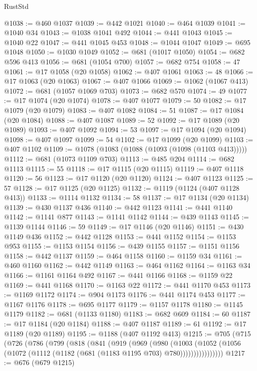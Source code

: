 \begin{lexlean}{RustStd}
\begin{coremodule}
{\begin{coremodule}
{{{{{{{{{{{{{{{{{{{{{{{{{@1038 := @460 @1037
@1039 := @442 @1021
@1040 := @464 @1039
@1041 := @1040 @34
@1043 := @1038 @1041 @492
@1044 := @441 @1043
@1045 := @1040 @22
@1047 := @441 @1045 @453
@1048 := @1044 @1047
@1049 := @695 @1048
@1050 := @1030 @1049
@1052 := @681 (@1017 @1050)
@1054 := @682 @596 @413
@1056 := @681 (@1054 @700)
@1057 := @682 @754
@1058 := 47
@1061 := @17 @1058 (@20 @1058)
@1062 := @407 @1061
@1063 := 48
@1066 := @17 @1063 (@20 @1063)
@1067 := @407 @1066
@1069 := @1062 (@1067 @413)
@1072 := @681 (@1057 @1069 @703)
@1073 := @682 @570
@1074 := 49
@1077 := @17 @1074 (@20 @1074)
@1078 := @407 @1077
@1079 := 50
@1082 := @17 @1079 (@20 @1079)
@1083 := @407 @1082
@1084 := 51
@1087 := @17 @1084 (@20 @1084)
@1088 := @407 @1087
@1089 := 52
@1092 := @17 @1089 (@20 @1089)
@1093 := @407 @1092
@1094 := 53
@1097 := @17 @1094 (@20 @1094)
@1098 := @407 @1097
@1099 := 54
@1102 := @17 @1099 (@20 @1099)
@1103 := @407 @1102
@1109 := @1078 (@1083 (@1088 (@1093 (@1098 (@1103 @413)))))
@1112 := @681 (@1073 @1109 @703)
@1113 := @485 @204
@1114 := @682 @1113
@1115 := 55
@1118 := @17 @1115 (@20 @1115)
@1119 := @407 @1118
@1120 := 56
@1123 := @17 @1120 (@20 @1120)
@1124 := @407 @1123
@1125 := 57
@1128 := @17 @1125 (@20 @1125)
@1132 := @1119 (@1124 (@407 @1128 @413))
@1133 := @1114 @1132
@1134 := 58
@1137 := @17 @1134 (@20 @1134)
@1139 := @430 @1137 @436
@1140 := @442 @1123
@1141 := @441 @1140
@1142 := @1141 @877
@1143 := @1141 @1142
@1144 := @439 @1143
@1145 := @1139 @1144
@1146 := 59
@1149 := @17 @1146 (@20 @1146)
@1151 := @430 @1149 @436
@1152 := @442 @1128
@1153 := @441 @1152
@1154 := @1153 @953
@1155 := @1153 @1154
@1156 := @439 @1155
@1157 := @1151 @1156
@1158 := @442 @1137
@1159 := @464 @1158
@1160 := @1159 @34
@1161 := @460 @1160
@1162 := @442 @1149
@1163 := @464 @1162
@1164 := @1163 @34
@1166 := @1161 @1164 @492
@1167 := @441 @1166
@1168 := @1159 @22
@1169 := @441 @1168
@1170 := @1163 @22
@1172 := @441 @1170 @453
@1173 := @1169 @1172
@1174 := @904 @1173
@1176 := @441 @1174 @453
@1177 := @1167 @1176
@1178 := @695 @1177
@1179 := @1157 @1178
@1180 := @1145 @1179
@1182 := @681 (@1133 @1180)
@1183 := @682 @609
@1184 := 60
@1187 := @17 @1184 (@20 @1184)
@1188 := @407 @1187
@1189 := 61
@1192 := @17 @1189 (@20 @1189)
@1195 := @1188 (@407 @1192 @413)
@1215 := @705
    (@715
      (@726
        (@786
          (@799
            (@818
              (@841
                (@919
                  (@969
                    (@980
                      (@1003
                        (@1052
                          (@1056 (@1072 (@1112 (@1182 (@681 (@1183 @1195 @703) @780))))))))))))))))
@1217 := @676 (@679 @1215)
}}}}}}}}}}}}}}}}}}}}}}}}}
\end{coremodule}}
\end{coremodule}
\end{lexlean}
